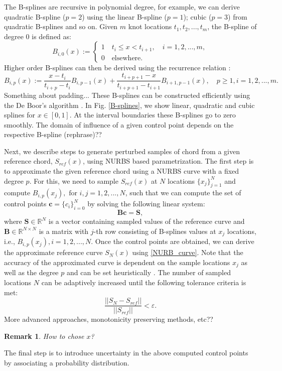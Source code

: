 \documentclass[review]{elsarticle}
\newtheorem{remark}{Remark}[section]
\numberwithin{equation}{section}
\numberwithin{equation}{section}
\begin{document}
The B-splines are recursive in polynomial degree, for example, we can derive quadratic B-spline ($p=2$) using the linear B-spline ($p=1$); cubic ($p=3$) from quadratic B-splines and so on. Given $m$ knot locations $t_1, t_2, ..., t_{m}$, the B-spline of degree 0 is defined as:
\begin{equation}\label{linearBspline}
B_{i,0}(x) :=
\begin{cases}
1\quad t_i\leq x < t_{i+1},\quad i = 1,2,...,m,\\
0\quad\text{elsewhere.}
\end{cases} 
\end{equation}
Higher order B-splines can then be derived using the recurrence relation \cite{deBoor}:
\begin{equation}\label{NURBS_recurrence}
B_{i,p}(x) := \frac{x-t_i}{t_{i+p} - t_i}B_{i,p-1}(x) + \frac{t_{i+p+1}  -  x}{t_{i+p+1}  -  t_{i+1}}B_{i+1,p-1}(x),\quad p\geq1, i = 1,2,...,m.
\end{equation} 
Something about padding...
These B-splines can be constructed efficiently using the De Boor's algorithm \cite{deBoor}. In Fig. \ref{B-splines}, we show linear, quadratic and cubic splines for $x\in[0,1]$. At the interval boundaries these B-splines go to zero smoothly. The domain of influence of a given control point depends on the respective B-spline (rephrase)??

Next, we describe steps to generate perturbed samples of chord from a given reference chord, $S_{ref}(x)$, using NURBS based parametrization. The first step is to approximate the given reference chord using a NURBS curve with a fixed degree $p$. For this, we need to sample $S_{ref}(x)$ at $N$ locations $\{x_j\}_{j=1}^N$ and compute $B_{i,p}(x_j), \text{ for }i, j = 1,2, ..., N$, such that we can compute the set of control points $\mathbf{c}=\{c_i\}_{i=0}^N$ by solving the following linear system:
\begin{equation}\label{nurbs_inversion}
\mathbf{B}\mathbf{c} = \mathbf{S},
\end{equation}
where $\mathbf{S}\in \mathbb{R}^{N}$ is a vector containing sampled values of the reference curve and $\mathbf{B}\in \mathbb{R}^{N\times N}$ is a matrix with $j$-th row consisting of B-splines values at $x_j$ locations, i.e., $B_{i,p}(x_j), i= 1, 2,..., N$. 
Once the control points are obtained, we can derive the approximate reference curve $S_N(x)$ using \eqref{NURB_curve}. Note that the accuracy of the approximated curve is dependent on the sample locations $x_j$ as well as the degree $p$ and can be set heuristically \cite{adaptiveNurbs}. The number of sampled locations $N$ can be adaptively increased until the following tolerance criteria is met:
\begin{equation}
\frac{||S_N - S_{ref}||}{||S_{ref}||} <\varepsilon.
\end{equation}
More advanced approaches, monotonicity preserving methods, etc??
\begin{remark}
How to chose $x$?
\end{remark}
The final step is to introduce uncertainty in the above computed control points by associating a probability distribution.
\end{document}
